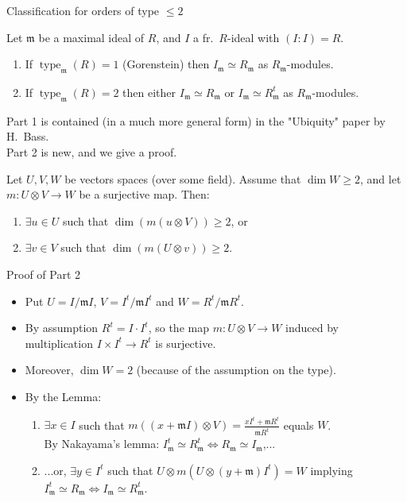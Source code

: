 \documentclass[usenames,dvipsnames,handout]{beamer}
\DeclareMathOperator{\type}{type}
\renewcommand{\frm}{{\mathfrak m}}
\begin{document}
\begin{frame}{ Classification for orders of type $\leq 2$ } 
    \begin{theorem}
        Let $\frm$ be a maximal ideal of $R$, and $I$ a fr.~$R$-ideal with $(I:I)=R$.
        \begin{enumerate}
            \item \pause If $\type_\frm(R)=1$ (Gorenstein) then $I_\frm\simeq R_\frm$ as $R_\frm$-modules.
            \item \pause If $\type_\frm(R)=2$ then either $I_\frm\simeq R_\frm$ or $I_\frm\simeq R^t_\frm$  as $R_\frm$-modules.
        \end{enumerate}
    \end{theorem}

    \pause Part 1 is contained (in a much more general form) in the "Ubiquity" paper by H.~Bass.\\
    Part 2 is new, and we give a proof.
    \pause 
\begin{lemma}
    Let $U,V,W$ be vectors spaces (over some field). Assume that $\dim W \ge 2$, and let $m: U\otimes V\to W$ be a surjective map. Then:
    \begin{enumerate}
        \item \pause $\exists u\in U$ such that $\dim(m(u\otimes V)) \ge 2$, or
        \item \pause $\exists v\in V$ such that $\dim(m(U\otimes v)) \ge 2$.
    \end{enumerate}
\end{lemma}

\end{frame}


\begin{frame}{ Proof of Part 2 } 
    \begin{itemize}
    \item \pause Put $U = I/\frm I$, $V = I^t/\frm I^t$ and $W = R^t/\frm R^t$.
    \item \pause By assumption $R^t = I \cdot I^t$, so the map $ m: U \otimes V \to W $ induced by multiplication $I \times I^t \to R^t$
    is surjective.
    \item \pause Moreover, $\dim W = 2$ (because of the assumption on the type).
    \item \pause By the Lemma:
    \begin{enumerate}
        \item $\exists x \in I$ such that $m( (x+\frm I) \otimes V  ) = \frac{x I^t + \frm R^t }{ \frm R^t }$ equals $W$.\\
            By Nakayama's lemma: $I_\frm^t\simeq R_\frm^t \iff R_\frm\simeq I_\frm $,...
        \item \pause ...or, $\exists y \in I^t$ such that $U \otimes m( U \otimes (y+\frm) I^t ) = W $ implying $I^t_\frm \simeq R_\frm \iff I_\frm \simeq R^t_\frm$.
    \end{enumerate}
	\end{itemize}
\end{frame}
\end{document}
